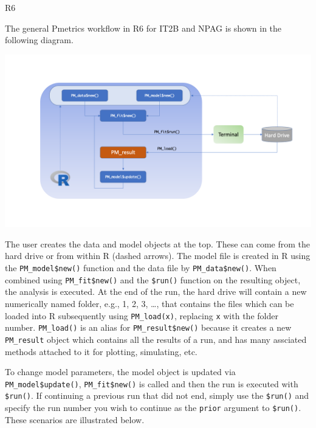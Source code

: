 \documentclass[
]{book}
\begin{document}
{R6}

The general Pmetrics workflow in R6 for IT2B and NPAG is shown in the
following diagram.

\includegraphics{Images/Slide1.png}

The user creates the data and model objects at the top. These can come from the hard drive or from within R (dashed arrows). The model file is created in R using
the \texttt{PM\_model\$new()} function and the data file by \texttt{PM\_data\$new()}. When combined using \texttt{PM\_fit\$new()} and the \texttt{\$run()} function
on the resulting object, the analysis is executed. At the end of the run, the hard drive will contain a new numerically named folder, e.g., 1, 2, 3, \ldots, that contains the files which can be loaded into R subsequently using
\texttt{PM\_load(x)}, replacing \texttt{x} with the folder number. \texttt{PM\_load()} is an alias for \texttt{PM\_result\$new()} because it creates a new \texttt{PM\_result} object which contains all the results of a run, and has many assciated methods attached to it for plotting, simulating, etc.

To change model parameters, the model object is updated via \texttt{PM\_model\$update()}, \texttt{PM\_fit\$new()} is called and then the run is executed with \texttt{\$run()}. If continuing a previous run that did not end, simply use the \texttt{\$run()} and specify the run number you wish to continue as the \texttt{prior} argument to \texttt{\$run()}. These scenarios are illustrated below.
\end{document}
